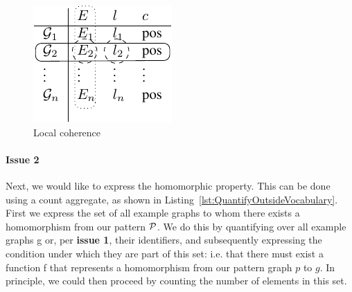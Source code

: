 
\begin{figure}[h]
\centering
\includegraphics{CoherenceTable-crop.pdf}
\caption{Local coherence\label{fig:LocalCoherence}}
\end{figure}


\paragraph{Issue 2}
Next, we would like to express the homomorphic property.
This can be done using a count aggregate, as shown in Listing~\ref{lst:QuantifyOutsideVocabulary}.
First we express the set of all example graphs to whom there exists a homomorphism from our pattern $\mathcal{P}$.
We do this by quantifying over all example graphs g or, per \textbf{issue 1}, their identifiers, and subsequently 
expressing the condition under which they are part of this set: i.e. that there must exist a function f that represents a homomorphism from our pattern graph $p$ to $g$.
In principle, we could then proceed by counting the number of elements in this set.

